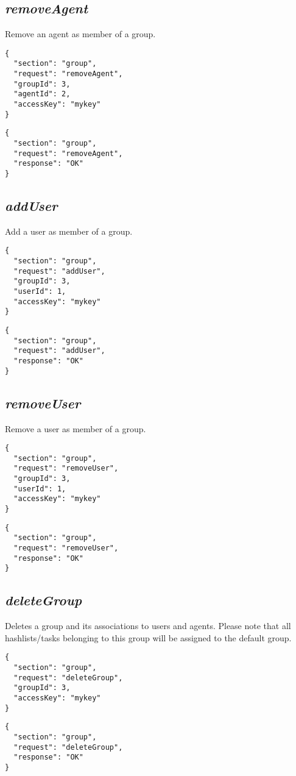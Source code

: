 \subsection*{\textit{removeAgent}}
	Remove an agent as member of a group.
	{
		\color{blue}
		\begin{verbatim}
{
  "section": "group",
  "request": "removeAgent",
  "groupId": 3,
  "agentId": 2,
  "accessKey": "mykey"
}
		\end{verbatim}
	}
	{
		\color{OliveGreen}
		\begin{verbatim}
{
  "section": "group",
  "request": "removeAgent",
  "response": "OK"
}
		\end{verbatim}
	}
\subsection*{\textit{addUser}}
	Add a user as member of a group.
	{
		\color{blue}
		\begin{verbatim}
{
  "section": "group",
  "request": "addUser",
  "groupId": 3,
  "userId": 1,
  "accessKey": "mykey"
}
		\end{verbatim}
	}
	{
		\color{OliveGreen}
		\begin{verbatim}
{
  "section": "group",
  "request": "addUser",
  "response": "OK"
}
		\end{verbatim}
	}
\subsection*{\textit{removeUser}}
	Remove a user as member of a group.
	{
		\color{blue}
		\begin{verbatim}
{
  "section": "group",
  "request": "removeUser",
  "groupId": 3,
  "userId": 1,
  "accessKey": "mykey"
}
		\end{verbatim}
	}
	{
		\color{OliveGreen}
		\begin{verbatim}
{
  "section": "group",
  "request": "removeUser",
  "response": "OK"
}
		\end{verbatim}
	}
\subsection*{\textit{deleteGroup}}
	Deletes a group and its associations to users and agents. Please note that all hashlists/tasks belonging to this group will be assigned to the default group.
	{
		\color{blue}
		\begin{verbatim}
{
  "section": "group",
  "request": "deleteGroup",
  "groupId": 3,
  "accessKey": "mykey"
}
		\end{verbatim}
	}
	{
		\color{OliveGreen}
		\begin{verbatim}
{
  "section": "group",
  "request": "deleteGroup",
  "response": "OK"
}
		\end{verbatim}
	}
